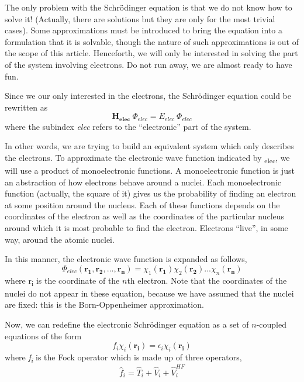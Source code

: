 \documentclass{tmr}
\begin{document}
\par The only problem with the Schr\"odinger equation is that we do not know how to solve it!
(Actually, there are solutions but they are only for the most trivial cases).
Some approximations must be introduced to bring the equation into
a formulation that it is solvable, though the nature of such approximations is out of the scope of this article.
Henceforth, we will only be interested in solving the part of the system involving
electrons. Do not run away, we are almost ready to have fun.

Since we our only interested in the electrons, the Schr\"{o}dinger equation could be rewritten as
\[\mathbf{H_{elec}}\:\Phi_{elec} = E_{elec}\: \Phi_{elec}\]
where the subindex \textit{elec} refers to the ``electronic'' part of the system.

In other words, we are trying to build an equivalent system which only describes the electrons.
To approximate the electronic wave function indicated by \textPhi\textsubscript{elec},
we will use a product of monoelectronic functions. A monoelectronic function is just an
abstraction of how electrons behave around a nuclei. Each monoelectronic
function (actually, the square of it) gives us the probability of finding an electron at some
position around the nucleus. Each of these functions depends on the coordinates of the electron as well
as the coordinates of the particular nucleus around which it is most probable to 
find the electron. Electrons ``live'', in some way, around the atomic nuclei.

In this manner, the electronic wave function is expanded as follows,
\begin{equation}\label{8}
 \Phi_{elec}(\mathbf{r_{1}},\mathbf{r_{2}},...,\mathbf{r_{n}}) =
 \chi_{1}(\mathbf{r_{1}})\chi_{2}(\mathbf{r_{2}})...\chi_{n}(\mathbf{r_{n}})
 \end{equation}                                                                                                                
where r\textsubscript{i} is the coordinate of the $n$th electron. Note that the coordinates of the nuclei do not
appear in these equation, because we have assumed that the nuclei are fixed: this is the Born-Oppenheimer approximation.

Now, we can redefine the electronic Schr\"odinger equation as a set of $n$-coupled equations of 
the form 
\begin{equation}\label{9}
 f_{i}\chi_{i}(\mathbf{r_{i}}) = \epsilon_{i}\chi_{i}(\mathbf{r_{i}})
\end{equation}
where \textit{f\textsubscript{i}} is the Fock operator which is made up
of three operators,
\begin{equation}\label{10}
\hat f_{i} = \hat T_{i}  + \hat V_{i} + \hat V^{HF}_{i} 
\end{equation}
\end{document}
